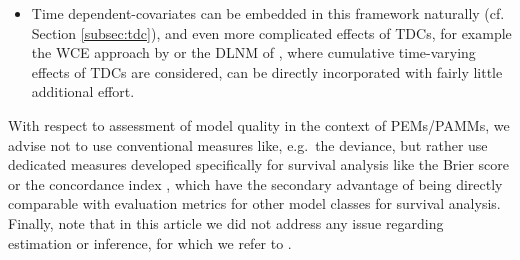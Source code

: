 \documentclass[submit]{smj}
\begin{document}
\begin{itemize}
\item Time dependent-covariates can be embedded in this framework naturally
(cf. Section \ref{subsec:tdc}), and even more complicated effects of TDCs,
for example the WCE approach by \cite{Sylvestre2009} or the DLNM of
\cite{Gasparrini2017}, where cumulative time-varying effects of TDCs are
considered, can be directly incorporated with fairly little additional effort.

\end{itemize}


With respect to assessment of model quality in the context of PEMs/PAMMs,
we advise not to use conventional measures like, e.g.\ the deviance,
but rather use dedicated measures developed specifically for survival analysis
like the Brier score or the concordance index \citep{gerds_estimating_2013},
which have the secondary advantage of being directly comparable with evaluation
metrics for other model classes for survival analysis.
Finally, note that in this article we did not address any issue regarding
estimation or inference, for which we refer to \cite{Wood2017,Wood:2011}.



\end{document}
